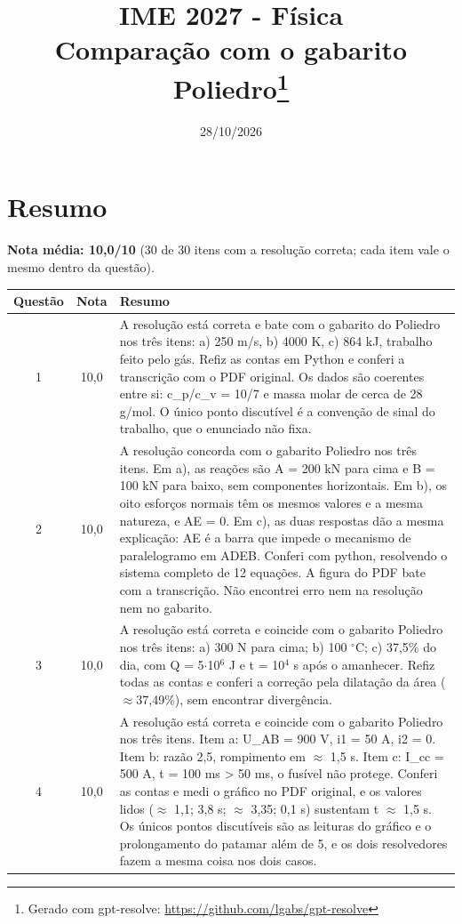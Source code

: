 \documentclass{article}%
\title{IME 2027 {-} Física\\[4pt]\large Comparação com o gabarito Poliedro\thanks{Gerado com gpt-resolve: \url{https://github.com/lgabs/gpt-resolve}}}%
\date{28/10/2026}%
\begin{document}
%
\normalsize%
\maketitle%
\section*{Resumo}\textbf{Nota média: 10,0/10} (30 de 30 itens com a resolução correta; cada item vale o mesmo dentro da questão).\par\medskip%
\begin{longtable}{@{}c c p{}@{}}\toprule Questão & Nota & Resumo \\ \midrule
1 & 10,0 & A resolução está correta e bate com o gabarito do Poliedro nos três itens: a) 250 m/s, b) 4000 K, c) 864 kJ, trabalho feito pelo gás. Refiz as contas em Python e conferi a transcrição com o PDF original. Os dados são coerentes entre si: c\_p/c\_v = 10/7 e massa molar de cerca de 28 g/mol. O único ponto discutível é a convenção de sinal do trabalho, que o enunciado não fixa. \\
2 & 10,0 & A resolução concorda com o gabarito Poliedro nos três itens. Em a), as reações são A = 200 kN para cima e B = 100 kN para baixo, sem componentes horizontais. Em b), os oito esforços normais têm os mesmos valores e a mesma natureza, e AE = 0. Em c), as duas respostas dão a mesma explicação: AE é a barra que impede o mecanismo de paralelogramo em ADEB. Conferi com python, resolvendo o sistema completo de 12 equações. A figura do PDF bate com a transcrição. Não encontrei erro nem na resolução nem no gabarito. \\
3 & 10,0 & A resolução está correta e coincide com o gabarito Poliedro nos três itens: a) 300 N para cima; b) 100 $^\circ$C; c) 37,5\% do dia, com Q = 5$\cdot$10$^{6}$ J e t = 10$^{4}$ s após o amanhecer. Refiz todas as contas e conferi a correção pela dilatação da área ($\approx$37,49\%), sem encontrar divergência. \\
4 & 10,0 & A resolução está correta e coincide com o gabarito Poliedro nos três itens. Item a: U\_AB = 900 V, i1 = 50 A, i2 = 0. Item b: razão 2,5, rompimento em $\approx$ 1,5 s. Item c: I\_cc = 500 A, t = 100 ms > 50 ms, o fusível não protege. Conferi as contas e medi o gráfico no PDF original, e os valores lidos ($\approx$ 1,1; 3,8 s; $\approx$ 3,35; 0,1 s) sustentam t $\approx$ 1,5 s. Os únicos pontos discutíveis são as leituras do gráfico e o prolongamento do patamar além de 5, e os dois resolvedores fazem a mesma coisa nos dois casos. \\

\end{longtable}
\end{document}
